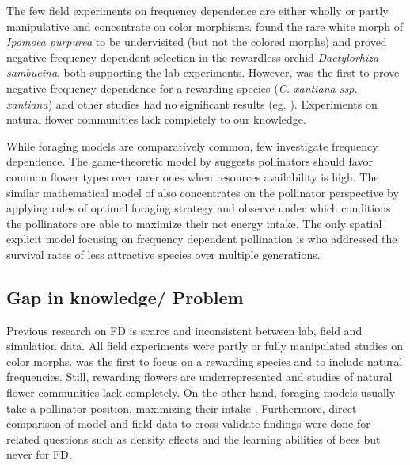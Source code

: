 The few field experiments on frequency dependence are either wholly or partly manipulative and concentrate on color morphisms. \cite{epperson1987frequency} found the rare white morph of \textit{Ipomoea purpurea} to be undervisited (but not the colored morphs) and \cite{gigord2001negative} proved negative frequency-dependent selection in the rewardless orchid \textit{Dactylorhiza sambucina}, both supporting the lab experiments. However, \cite{Eckhart2006frequency} was the first to prove negative frequency dependence for a rewarding species (\textit{C. xantiana ssp. xantiana}) and other studies had no significant results (eg. \citealt{jones1996pollinator, mogford1978pollination}). Experiments on natural flower communities lack completely to our knowledge. 

While foraging models are comparatively common, few investigate frequency dependence. The game-theoretic model by \cite{kunin1996pollinator} suggests pollinators should favor common flower types over rarer ones when resources availability is high. The similar mathematical model of \cite{song2014adaptive} also concentrates on the pollinator perspective by applying rules of optimal foraging strategy and observe under which conditions the pollinators are able to maximize their net energy intake. The only spatial explicit model focusing on frequency dependent pollination is \cite{hanoteaux2013effects} who addressed the survival rates of less attractive species over multiple generations. 

\subsection*{Gap in knowledge/ Problem}

Previous research on FD is scarce and inconsistent between lab, field and simulation data.
All field experiments were partly or fully manipulated studies on color morphs. \cite{Eckhart2006frequency} was the first to focus on a rewarding species and to include natural frequencies. Still, rewarding flowers are underrepresented and studies of natural flower communities lack completely. On the other hand, foraging models usually take a pollinator position, maximizing their intake \cite{kunin1996pollinator,faruq2013biological,song2014adaptive}. Furthermore, direct comparison of model and field data to cross-validate findings were done for related questions such as density effects \citep{essenberg2012explaining} and the learning abilities of bees \citep{dyer2014bee} but never for FD. 

